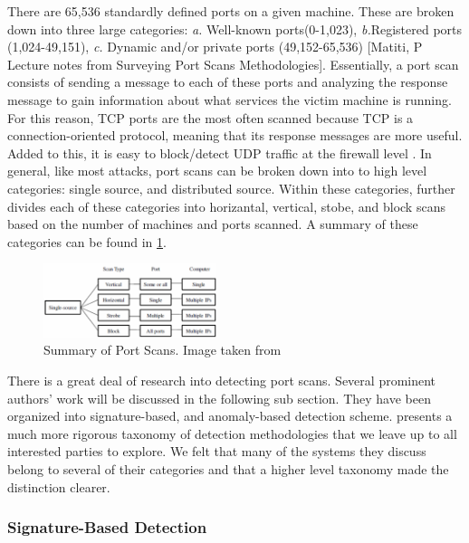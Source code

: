 \documentclass{acm_proc_article-sp}
\begin{document}
	 There are 65,536 standardly defined ports on a given machine. These are broken down into three large categories: \emph{a.} Well-known ports(0-1,023), \emph{b.}Registered ports (1,024-49,151), \emph{c.} Dynamic and/or private ports (49,152-65,536) [Matiti, P Lecture notes from Surveying Port Scans Methodologies]. %
Essentially, a port scan consists of sending a message to each of these ports and analyzing the response message to gain information about what services the victim machine is running. For this reason, TCP ports are the most often scanned because TCP is a connection-oriented protocol, meaning that its response messages are more useful. Added to this, it is easy to block/detect UDP traffic at the firewall level \cite{Bhuyan2011}. In general, like most attacks, port scans can be broken down into to high level categories: single source, and distributed source. Within these categories, \cite{Staniford2002} further divides each of these categories into horizantal, vertical, stobe, and block scans based on the number of machines and ports scanned. A summary of these categories can be found in \ref{portScans}.
	\begin{figure}[h!]
		\centering
		\includegraphics[width=0.45\textwidth]{portScans.png}
		\caption{Summary of Port Scans. Image taken from \cite{Bhuyan2011}}
		\label{portScans}
	\end{figure}
	
	There is a great deal of research into detecting port scans. Several prominent authors' work will be discussed in the following sub section. They have been organized into signature-based, and anomaly-based detection scheme. \cite{Bhuyan2011} presents a much more rigorous taxonomy of detection methodologies that we leave up to all interested parties to explore. We felt that many of the systems they discuss belong to several of their categories and that a higher level taxonomy made the distinction clearer. 
		\subsubsection{Signature-Based Detection}
		\begin{description}
			\item[] %
			\item[] %
		\end{description}
\end{document}
